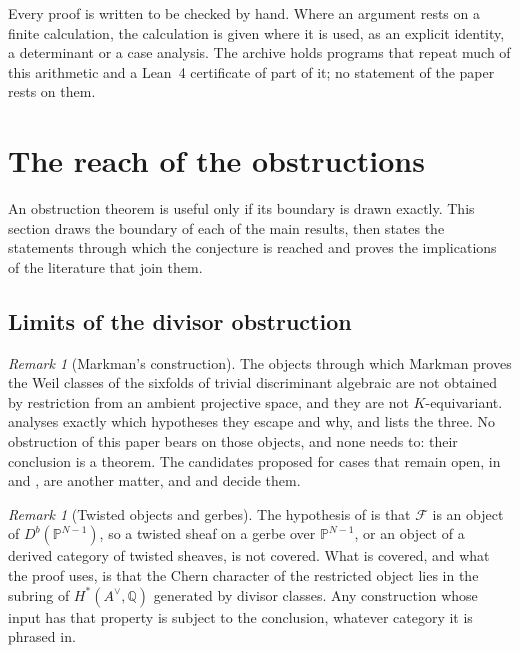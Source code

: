 \documentclass[11pt,reqno]{amsart}
\theoremstyle{plain}
\theoremstyle{definition}
\theoremstyle{remark}
\newtheorem{remark}[theorem]{Remark}
\newcommand{\QQ}{\mathbb{Q}}
\newcommand{\PP}{\mathbb{P}}
\newcommand{\Av}{A^{\vee}}
\newcommand{\cF}{\mathcal{F}}
\begin{document}
Every proof is written to be checked by hand. Where an argument rests on a
finite calculation, the calculation is given where it is used, as an explicit
identity, a determinant or a case analysis. The archive \cite{BMB26} holds
programs that repeat much of this arithmetic and a Lean~4 certificate of
part of it; no statement of the paper rests on them.
\section{The reach of the obstructions}\label{sec:scope}

An obstruction theorem is useful only if its boundary is drawn exactly. This
section draws the boundary of each of the main results, then states the
statements through which the conjecture is reached and proves the
implications of the literature that join them.

\subsection{Limits of the divisor obstruction}

\begin{remark}[Markman's construction]\label{rem:markmanscope}
The objects through which Markman proves the Weil classes of the sixfolds of
trivial discriminant algebraic \cite{Mar25a,Mar25b} are not obtained by
restriction from an ambient projective space, and they are not
$K$-equivariant. \cite[Section~13]{paperI} analyses exactly which hypotheses they
escape and why, and \cite[Proposition~13.5]{paperI} lists the three. No obstruction
of this paper bears on those objects, and none needs to: their conclusion is
a theorem. The candidates proposed for cases that remain open, in
\cite[Section~12]{Mar25b} and \cite[Example~11.2.7]{Mar25c}, are another
matter, and \cite[Theorem~4.61]{paperII} and \cite[Corollary~5.30]{paperII}
decide them.
\end{remark}

\begin{remark}[Twisted objects and gerbes]\label{rem:twisted}
The hypothesis of \cite[Theorem~7.3]{paperI} is that $\cF$ is an object of
$D^{b}(\PP^{N-1})$, so a twisted sheaf on a gerbe over $\PP^{N-1}$, or an
object of a derived category of twisted sheaves, is not covered. What is
covered, and what the proof uses, is that the Chern character of the
restricted object lies in the subring of $H^{*}(\Av,\QQ)$ generated by
divisor classes. Any construction whose input has that property is subject to
the conclusion, whatever category it is phrased in.
\end{remark}
\end{document}
